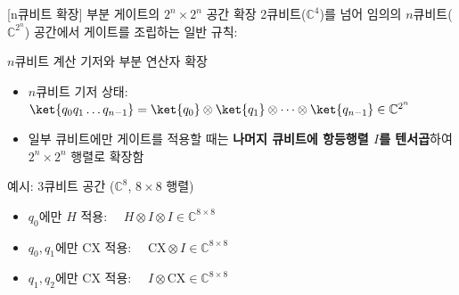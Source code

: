\documentclass[aspectratio=169, 10pt]{beamer}
\begin{document}
\begin{frame}{[n큐비트 확장] 부분 게이트의 $2^n \times 2^n$ 공간 확장}
    2큐비트($\mathbb{C}^4$)를 넘어 임의의 $n$큐비트($\mathbb{C}^{2^n}$) 공간에서 게이트를 조립하는 일반 규칙:
    \pause
    \vspace{0.15cm}
    \begin{qcblock}{$n$큐비트 계산 기저와 부분 연산자 확장}
        \begin{itemize}
            \item $n$큐비트 기저 상태: $\ket{q_0 q_1 \dots q_{n-1}} = \ket{q_0} \otimes \ket{q_1} \otimes \dots \otimes \ket{q_{n-1}} \in \mathbb{C}^{2^n}$
            \pause
            \item 일부 큐비트에만 게이트를 적용할 때는 \textbf{나머지 큐비트에 항등행렬 $I$를 텐서곱}하여 $2^n \times 2^n$ 행렬로 확장함
        \end{itemize}
    \end{qcblock}
    \pause
    \vspace{0.1cm}
    \begin{qctip}{예시: 3큐비트 공간 ($\mathbb{C}^8$, $8 \times 8$ 행렬)}
        \begin{itemize}
            \item $q_0$에만 $H$ 적용: $\quad H \otimes I \otimes I \in \mathbb{C}^{8 \times 8}$
            \pause
            \item $q_0, q_1$에만 $\mathrm{CX}$ 적용: $\quad \mathrm{CX} \otimes I \in \mathbb{C}^{8 \times 8}$
            \pause
            \item $q_1, q_2$에만 $\mathrm{CX}$ 적용: $\quad I \otimes \mathrm{CX} \in \mathbb{C}^{8 \times 8}$
        \end{itemize}
    \end{qctip}
\end{frame}
\end{document}
